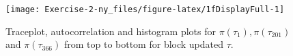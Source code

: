 \documentclass[
]{article}
\newenvironment{Shaded}{\begin{snugshade}}{\end{snugshade}}
\newcommand{\AttributeTok}[1]{\textcolor[rgb]{0.77,0.63,0.00}{#1}}
\newcommand{\DecValTok}[1]{\textcolor[rgb]{0.00,0.00,0.81}{#1}}
\newcommand{\FunctionTok}[1]{\textcolor[rgb]{0.00,0.00,0.00}{#1}}
\newcommand{\NormalTok}[1]{#1}
\newcommand{\OtherTok}[1]{\textcolor[rgb]{0.56,0.35,0.01}{#1}}
\newcommand{\SpecialCharTok}[1]{\textcolor[rgb]{0.00,0.00,0.00}{#1}}
\begin{document}
\begin{Shaded}
\end{Shaded}

\begin{figure}

{\centering \texttt{[image: Exercise-2-ny\_files/figure-latex/1fDisplayFull-1]} 

}

\caption{Traceplot, autocorrelation and histogram plots for $\pi(\tau_1), \pi(\tau_{201})$ and $\pi(\tau_{366})$ from top to bottom for block updated $\tau$.}\label{fig:1fDisplayFull}
\end{figure}
\end{document}
